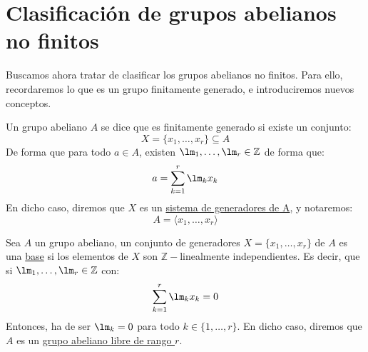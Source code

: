 \section{Clasificación de grupos abelianos no finitos}
\noindent
Buscamos ahora tratar de clasificar los grupos abelianos no finitos. Para ello, recordaremos lo que es un grupo finitamente generado, e introduciremos nuevos conceptos.

\begin{definicion}
    Un grupo abeliano $A$ se dice que es finitamente generado si existe un conjunto:
    \begin{equation*}
        X = \{x_1,\ldots,x_r\} \subseteq A
    \end{equation*}
    De forma que para todo $a\in A$, existen $\lm_1, \ldots, \lm_r \in \mathbb{Z}$ de forma que:
    \begin{equation*}
        a = \sum_{k=1}^{r} \lm_k x_k
    \end{equation*}
    En dicho caso, diremos que $X$ es un \underline{sistema de generadores de A}, y notaremos:
    \begin{equation*}
        A = \langle x_1, \ldots, x_r \rangle 
    \end{equation*}
\end{definicion}

\begin{definicion}[Base]
Sea $A$ un grupo abeliano, un conjunto de generadores $X = \{x_1,\ldots,x_r\}$ de $A$ es una \underline{base} si los elementos de $X$ son $\mathbb{Z}-$linealmente independientes. Es decir, que si $\lm_1,\ldots,\lm_r\in \mathbb{Z}$ con:
\begin{equation*}
    \sum_{k=1}^{r}\lm_k x_k = 0
\end{equation*}
Entonces, ha de ser $\lm_k = 0$ para todo $k\in \{1,\ldots,r\}$. En dicho caso, diremos que $A$ es un \underline{grupo abeliano libre de rango $r$}.
\end{definicion}


